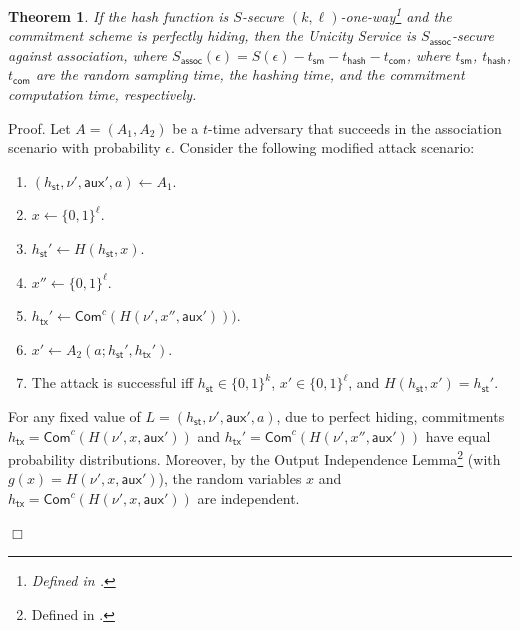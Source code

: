 \documentclass{article}
\newtheorem{theorem}{Theorem}[section]
\newenvironment{proof}{\textsf{Proof}.}{\hfill$\Box$}
\newcommand{\pubkey}[0]{\mathsf{pk}}
\newcommand{\commitc}[0]{\mathsf{Com}^{c}}
\newcommand{\sthash}[0]{h_\mathsf{st}}
\newcommand{\txhash}[0]{h_\mathsf{tx}}
\newcommand{\auxd}[0]{\mathsf{aux}}
\newcommand{\predi}[0]{\nu}
\begin{document}
\begin{theorem}
If the hash function is $S$-secure $(k,\ell)$-one-way\footnote{Defined in \cite{BTLR25}.} and the commitment scheme is perfectly hiding, then the Unicity Service is $S_\mathsf{assoc}$-secure against association, where $S_\mathsf{assoc}(\epsilon)= S(\epsilon) - t_\mathsf{sm} - t_\mathsf{hash} - t_\mathsf{com}$, where
$t_\mathsf{sm}$, $t_\mathsf{hash}$, $t_\mathsf{com}$ are the random sampling time, the hashing time, and the commitment computation time, respectively.
\end{theorem}
\begin{proof}
Let $A=(A_1,A_2)$ be a $t$-time adversary that succeeds in the association scenario with probability $\epsilon$. Consider the following modified attack scenario:
\begin{enumerate}
\item $(\sthash, \predi', \auxd', a)\gets A_1$.
\item $x\gets \{0,1\}^\ell$.
\item $\sthash'\gets H(\sthash,x)$.
\item $x''\gets \{0,1\}^\ell$.
\item $\txhash'\gets\commitc(H(\predi',x'',\auxd')))$.
\item $x'\gets A_2(a; \sthash',\txhash')$.
\item The attack is successful iff $\sthash\in\{0,1\}^k$, $x'\in\{0,1\}^\ell$, and $H(\sthash,x')=\sthash'$.
\end{enumerate}

\noindent For any fixed value of $L=(\sthash, \predi', \auxd', a)$, due to perfect hiding, commitments $\txhash=\commitc(H(\predi',x,\auxd'))$ and $\txhash'=\commitc(H(\predi',x'',\auxd'))$ have equal probability distributions. Moreover, by the Output Independence Lemma\footnote{Defined in \cite{BTLR25}.} (with $g(x)=H(\predi',x,\auxd')$), the random variables $x$ and $\txhash=\commitc(H(\predi',x,\auxd'))$ are independent.


\end{proof}
\end{document}
